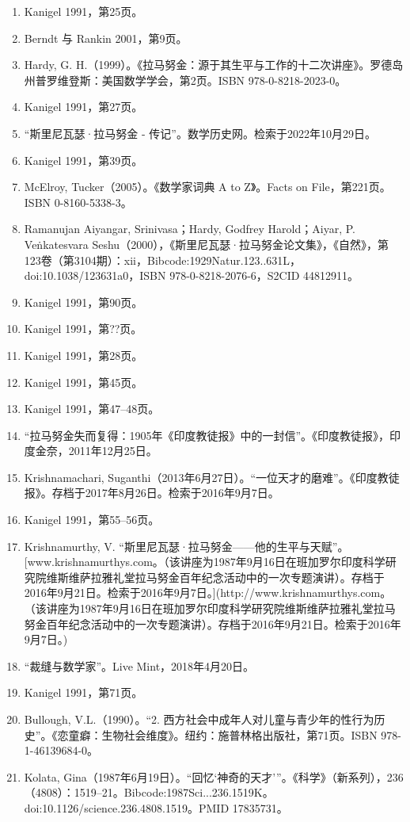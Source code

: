 \begin{enumerate}
\item Kanigel 1991，第25页。
\item Berndt 与 Rankin 2001，第9页。
\item Hardy, G. H.（1999）。《拉马努金：源于其生平与工作的十二次讲座》。罗德岛州普罗维登斯：美国数学学会，第2页。ISBN 978-0-8218-2023-0。
\item Kanigel 1991，第27页。
\item “斯里尼瓦瑟·拉马努金 - 传记”。数学历史网。检索于2022年10月29日。
\item Kanigel 1991，第39页。
\item McElroy, Tucker（2005）。《数学家词典 A to Z》。Facts on File，第221页。ISBN 0-8160-5338-3。
\item Ramanujan Aiyangar, Srinivasa；Hardy, Godfrey Harold；Aiyar, P. Veṅkatesvara Seshu（2000），《斯里尼瓦瑟·拉马努金论文集》，《自然》，第123卷（第3104期）：xii，Bibcode:1929Natur.123..631L，doi:10.1038/123631a0，ISBN 978-0-8218-2076-6，S2CID 44812911。
\item Kanigel 1991，第90页。
\item Kanigel 1991，第??页。
\item Kanigel 1991，第28页。
\item Kanigel 1991，第45页。
\item Kanigel 1991，第47–48页。
\item “拉马努金失而复得：1905年《印度教徒报》中的一封信”。《印度教徒报》，印度金奈，2011年12月25日。
\item Krishnamachari, Suganthi（2013年6月27日）。“一位天才的磨难”。《印度教徒报》。存档于2017年8月26日。检索于2016年9月7日。
\item Kanigel 1991，第55–56页。
\item Krishnamurthy, V. “斯里尼瓦瑟·拉马努金——他的生平与天赋”。[www.krishnamurthys.com。（该讲座为1987年9月16日在班加罗尔印度科学研究院维斯维萨拉雅礼堂拉马努金百年纪念活动中的一次专题演讲）。存档于2016年9月21日。检索于2016年9月7日。](http://www.krishnamurthys.com。（该讲座为1987年9月16日在班加罗尔印度科学研究院维斯维萨拉雅礼堂拉马努金百年纪念活动中的一次专题演讲）。存档于2016年9月21日。检索于2016年9月7日。)
\item “裁缝与数学家”。Live Mint，2018年4月20日。
\item Kanigel 1991，第71页。
\item Bullough, V.L.（1990）。“2. 西方社会中成年人对儿童与青少年的性行为历史”。《恋童癖：生物社会维度》。纽约：施普林格出版社，第71页。ISBN 978-1-46139684-0。
\item Kolata, Gina（1987年6月19日）。“回忆‘神奇的天才’”。《科学》（新系列），236（4808）：1519–21。Bibcode:1987Sci...236.1519K。doi:10.1126/science.236.4808.1519。PMID 17835731。

\end{enumerate}
